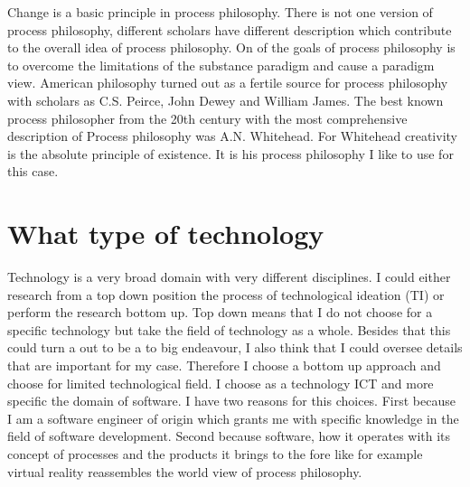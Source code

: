 Change is a basic principle in process philosophy. There is not one version of process philosophy, different scholars have different description which contribute to the overall idea of process philosophy.
On of the goals of process philosophy is to overcome the limitations of the substance paradigm and cause a paradigm view.
American philosophy turned out as a fertile source for process philosophy with scholars as C.S. Peirce, John Dewey and William James. The best known process philosopher from the 20th century with the most comprehensive description of Process philosophy was A.N. Whitehead. For Whitehead creativity is the absolute principle of existence. It is his process philosophy I like to use for this case.



\section{What type of technology}
Technology is a very broad domain with very different disciplines. 
I could either research from a top down position the process of technological ideation (TI) or perform the research bottom up.
Top down means that I do not choose for a specific technology but take the field of technology as a whole. Besides that this could turn a out to be a to big endeavour, I also think that I could oversee details that are important for my case. Therefore I choose a bottom up  approach and choose for limited technological field.
I choose as a technology ICT and more specific the domain of software. I have two reasons for this choices. First because I am a software engineer of origin which grants me with specific knowledge in the field of software development. Second because software, how it operates with its concept of processes and the products it brings to the fore like for example virtual reality reassembles the world view of process philosophy.


